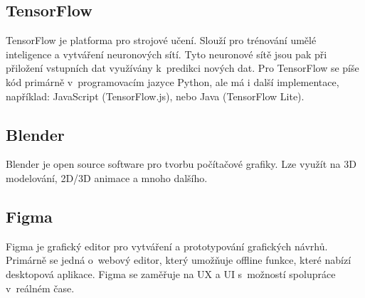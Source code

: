 \subsection{TensorFlow}
TensorFlow je platforma pro strojové učení. Slouží pro trénování umělé inteligence a vytváření neuronových sítí. Tyto neuronové sítě jsou pak při přiložení vstupních dat využívány k~predikci nových dat. Pro TensorFlow se píše kód primárně v~programovacím jazyce Python, ale má i další implementace, například: JavaScript (TensorFlow.js), nebo Java (TensorFlow Lite). \cite{TensorFlow}

\subsection{Blender}
Blender je open source software pro tvorbu počítačové grafiky. Lze využít na 3D modelování, 2D/3D animace a mnoho dalšího. \cite{Blender}

\subsection{Figma}
Figma je grafický editor pro vytváření a prototypování grafických návrhů. Primárně se jedná o~webový editor, který umožňuje offline funkce, které nabízí desktopová aplikace. Figma se zaměřuje na UX a UI s~možností spolupráce v~reálném čase. \cite{Figma}
